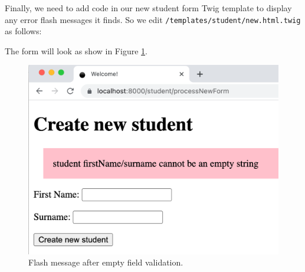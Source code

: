 \documentclass[a4paperpaper,openright]{book}
\newenvironment{Shaded}{}{}
\newcommand{\KeywordTok}[1]{\textcolor[rgb]{0.00,0.44,0.13}{\textbf{#1}}}
\newcommand{\NormalTok}[1]{#1}
\newcommand{\OtherTok}[1]{\textcolor[rgb]{0.00,0.44,0.13}{#1}}
\newcommand{\StringTok}[1]{\textcolor[rgb]{0.25,0.44,0.63}{#1}}
\begin{document}
Finally, we need to add code in our new student form Twig template to
display any error flash messages it finds. So we edit
\texttt{/templates/student/new.html.twig} as follows:

\begin{Shaded}
\end{Shaded}

The form will look as show in Figure \ref{new_student_form_flash}.

\begin{figure}
\centering
\includegraphics{./tex2pdf.-51e064f4751cea0e/88d0c302e1f2d9632d3424d8f78659914cf4b231.png}
\caption{Flash message after empty field validation.
\label{new_student_form_flash}}
\end{figure}
\end{document}
